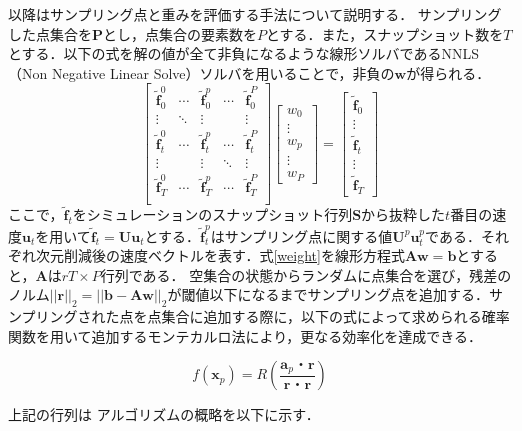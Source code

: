 \documentclass[a4j,12pt]{jreport}
\begin{document}
以降はサンプリング点と重みを評価する手法について説明する．
サンプリングした点集合を$\bm{P}$とし，点集合の要素数を$P$とする．また，スナップショット数を$T$とする．以下の式を解の値が全て非負になるような線形ソルバであるNNLS（Non Negative Linear Solve）ソルバを用いることで，非負の$\bm{w}$が得られる．
\begin{equation}\label{weight}
	 \begin{bmatrix}
	 \bm{\widetilde{f}}^0_0	&\cdots	&\bm{\widetilde{f}}^p_0	&\cdots	&\bm{\widetilde{f}}^P_0\\
		\vdots		&\ddots		&\vdots		&		&\vdots			\\
	\bm{\widetilde{f}}^0_t	&\cdots	&\bm{\widetilde{f}}^p_t	&\cdots	&\bm{\widetilde{f}}^P_t\\
		\vdots		&		&\vdots			&\ddots		&\vdots			\\
	\bm{\widetilde{f}}^0_T	&\cdots	&\bm{\widetilde{f}}^p_T	&\cdots	&\bm{\widetilde{f}}^P_T\\
	\end{bmatrix}
	\begin{bmatrix}
	w_0 	\\
	\vdots \\
	w_p \\
	\vdots \\
	w_P
	\end{bmatrix}=
	\begin{bmatrix}
	\bm{\widetilde{f}}_0 	\\
	\vdots \\
	\bm{\widetilde{f}}_t \\
	\vdots \\
	\bm{\widetilde{f}}_T
	\end{bmatrix}
\end{equation}
ここで，$\bm{\widetilde{f}}_t $をシミュレーションのスナップショット行列$\bm{S}$から抜粋した$t$番目の速度$\bm{u}_t$を用いて$\bm{\widetilde{f}}_t = \bm{U}\bm{u}_t$とする．$\bm{\widetilde{f}}^p_t$はサンプリング点に関する値$\bm{U}^p\bm{u}^p_t$である．それぞれ次元削減後の速度ベクトルを表す．式\ref{weight}を線形方程式$\bm{A}\bm{w} = \bm{b}$とすると，$\bm{A}$は$rT\times P$行列である．
空集合の状態からランダムに点集合を選び，残差のノルム$||\bm{r}||_2 = ||\bm{b} - \bm{A}\bm{w}||_2$が閾値以下になるまでサンプリング点を追加する．サンプリングされた点を点集合に追加する際に，以下の式によって求められる確率関数を用いて追加するモンテカルロ法により，更なる効率化を達成できる．

\[
f(\bm{x}_p) = R(\frac{\bm{a}_p・\bm{r}}{\bm{r}・\bm{r}})
\]

上記の行列は
アルゴリズムの概略を以下に示す．
\end{document}
